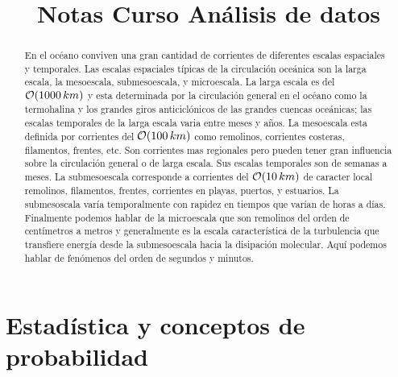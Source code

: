\documentclass[
]{agujournal2019}
\begin{document}
\title{Notas Curso Análisis de datos}




\begin{abstract}
En el océano conviven una gran cantidad de corrientes de diferentes
escalas espaciales y temporales. Las escalas espaciales típicas de la
circulación oceánica son la larga escala, la mesoescala, submesoescala,
y microescala. La larga escala es del \({\cal O}(1000\,km)\) y esta
determinada por la circulación general en el océano como la termohalina
y los grandes giros anticiclónicos de las grandes cuencas oceánicas; las
escalas temporales de la larga escala varia entre meses y años. La
mesoescala esta definida por corrientes del \({\cal O}(100\,km)\) como
remolinos, corrientes costeras, filamentos, frentes, etc. Son corrientes
mas regionales pero pueden tener gran influencia sobre la circulación
general o de larga escala. Sus escalas temporales son de semanas a
meses. La submesoescala corresponde a corrientes del
\({\cal O}(10\,km)\) de caracter local remolinos, filamentos, frentes,
corrientes en playas, puertos, y estuarios. La submesoscala varía
temporalmente con rapidez en tiempos que varían de horas a días.
Finalmente podemos hablar de la microescala que son remolinos del orden
de centímetros a metros y generalmente es la escala característica de la
turbulencia que transfiere energía desde la submesoescala hacia la
disipación molecular. Aquí podemos hablar de fenómenos del orden de
segundos y minutos.
\end{abstract}



\ifdefined\Shaded\renewenvironment{Shaded}{\begin{tcolorbox}[sharp corners, interior hidden, frame hidden, boxrule=0pt, borderline west={3pt}{0pt}{shadecolor}, breakable, enhanced]}{\end{tcolorbox}}\fi



\hypertarget{estaduxedstica-y-conceptos-de-probabilidad}{%
\section{Estadística y conceptos de
probabilidad}\label{estaduxedstica-y-conceptos-de-probabilidad}}
\end{document}
